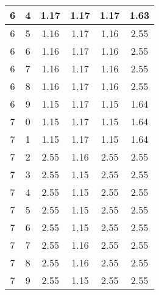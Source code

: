 \begin{longtable}{|c|c||c||c||c|c|}
	6 & 4 & 1.17 & 1.17 & 1.17 & 1.63 \\ \hline
	6 & 5 & 1.16 & 1.17 & 1.16 & 2.55 \\ \hline
	6 & 6 & 1.16 & 1.17 & 1.16 & 2.55 \\ \hline
	6 & 7 & 1.16 & 1.17 & 1.16 & 2.55 \\ \hline
	6 & 8 & 1.16 & 1.17 & 1.16 & 2.55 \\ \hline
	6 & 9 & 1.15 & 1.17 & 1.15 & 1.64 \\ \hline
	7 & 0 & 1.15 & 1.17 & 1.15 & 1.64 \\ \hline
	7 & 1 & 1.15 & 1.17 & 1.15 & 1.64 \\ \hline
	7 & 2 & 2.55 & 1.16 & 2.55 & 2.55 \\ \hline
	7 & 3 & 2.55 & 1.15 & 2.55 & 2.55 \\ \hline
	7 & 4 & 2.55 & 1.15 & 2.55 & 2.55 \\ \hline
	7 & 5 & 2.55 & 1.15 & 2.55 & 2.55 \\ \hline
	7 & 6 & 2.55 & 1.15 & 2.55 & 2.55 \\ \hline
	7 & 7 & 2.55 & 1.16 & 2.55 & 2.55 \\ \hline
	7 & 8 & 2.55 & 1.16 & 2.55 & 2.55 \\ \hline
	7 & 9 & 2.55 & 1.15 & 2.55 & 2.55 \\ \hline
\end{longtable}


